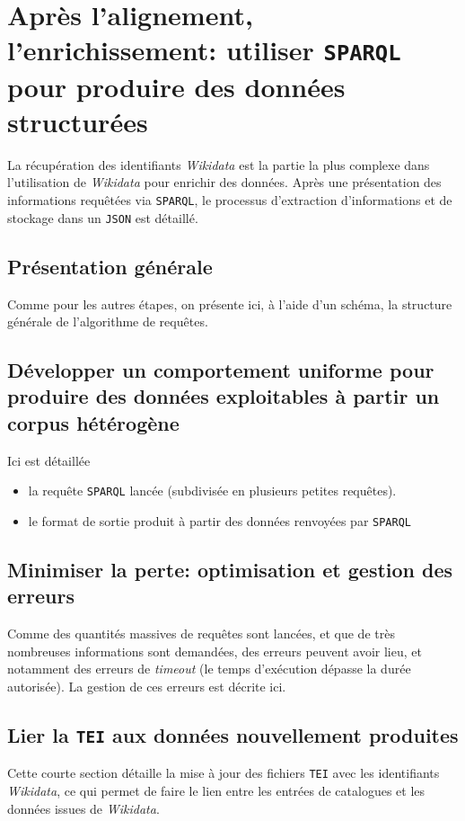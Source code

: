 \documentclass[a4paper, 12pt, twoside]{book}
\newcommand{\json}{\texttt{JSON}}
\newcommand{\sparql}{\texttt{SPARQL}}
\newcommand{\tei}{\texttt{TEI}}
\newcommand{\wkd}{\textit{Wikidata}}
\begin{document}
\section{Après l'alignement, l'enrichissement: utiliser \sparql{} pour produire des données structurées}
La récupération des identifiants \wkd{} est la partie la plus complexe dans l'utilisation de \wkd{} pour enrichir des données. Après une présentation des informations requêtées via \sparql{}, le processus d'extraction d'informations et de stockage dans un \json{} est détaillé.

\subsection{Présentation générale}
Comme pour les autres étapes, on présente ici, à l'aide d'un schéma, la structure générale de l'algorithme de requêtes.

\subsection{Développer un comportement uniforme pour produire des données exploitables à partir un corpus hétérogène}
Ici est détaillée 
\begin{itemize}
	\item la requête \sparql{} lancée (subdivisée en plusieurs petites requêtes).
	\item le format de sortie produit à partir des données renvoyées par \sparql
\end{itemize}

\subsection{Minimiser la perte: optimisation et gestion des erreurs}
Comme des quantités massives de requêtes sont lancées, et que de très nombreuses informations sont demandées, des erreurs peuvent avoir lieu, et notamment des erreurs de \textit{timeout} (le temps d'exécution dépasse la durée autorisée). La gestion de ces erreurs est décrite ici.

\subsection{Lier la \tei{} aux données nouvellement produites}
Cette courte section détaille la mise à jour des fichiers \tei{} avec les identifiants \wkd{}, ce qui permet de faire le lien entre les entrées de catalogues et les données issues de \wkd{}.
\end{document}
